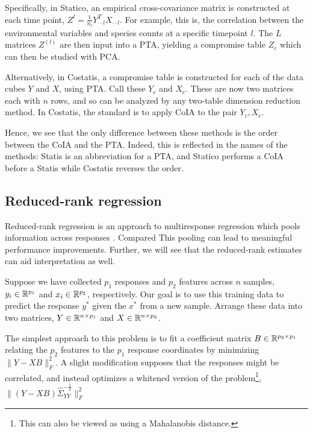 \documentclass{article}
\begin{document}
Specifically, in Statico, an empirical cross-covariance matrix is constructed at
each time point, $Z^{l} = \frac{1}{n_{l}}Y^{T}_{\cdot\cdot l}X_{\cdot \cdot l}$.
For example, this is, the correlation between the environmental variables and
species counts at a specific timepoint $l$. The $L$ matrices $Z^{(l)}$ are then
input into a PTA, yielding a compromise table $Z_{c}$ which can then be studied
with PCA.

Alternatively, in Costatis, a compromise table is constructed for each of the
data cubes $Y$ and $X$, using PTA. Call these $Y_{c}$ and $X_{c}$. These are now
two matrices each with $n$ rows, and so can be analyzed by any two-table
dimension reduction method. In Costatis, the standard is to apply CoIA to the
pair $Y_{c}, X_{c}$.

Hence, we see that the only difference between these methods is the order
between the CoIA and the PTA. Indeed, this is reflected in the names of the
methods: Statis is an abbreviation for a PTA, and Statico performs a CoIA before
a Statis while Costatis reverses the order.

\subsection{Reduced-rank regression}
\label{subsec:label}

Reduced-rank regression is an approach to multiresponse regression which pools
information across responses \citep{izenman1975reduced, mukherjee2011reduced}.
Compared This pooling can lead to meaningful performance improvements. Further,
we will see that the reduced-rank estimates can aid interpretation as well.

Suppose we have collected $p_{1}$ responses and $p_{2}$ features across $n$
samples, $y_{i} \in \mathbb{R}^{p_{1}}$ and $x_{i} \in \mathbb{R}^{p_{2}}$,
respectively. Our goal is to use this training data to predict the response
$y^{\ast}$ given the $x^{\ast}$ from a new sample. Arrange these data into two
matrices, $Y \in \mathbb{R}^{n \times p_{1}}$ and $X \in \mathbb{R}^{n \times p_{2}}$.

The simplest approach to this problem is to fit a coefficient matrix $B \in
\mathbb{R}^{p_{2} \times p_{1}}$ relating the $p_{2}$ features to the $p_{1}$
response coordinates by minimizing $\|Y - XB\|_{F}^{2}$. A slight modification
supposes that the responses might be correlated, and instead optimizes a
whitened version of the problem\footnote{This can also be viewed as using a
  Mahalanobis distance.}, $\|\left(Y -
XB\right)\hat{\Sigma}_{YY}^{-\frac{1}{2}}\|_{F}^{2}$
\end{document}
